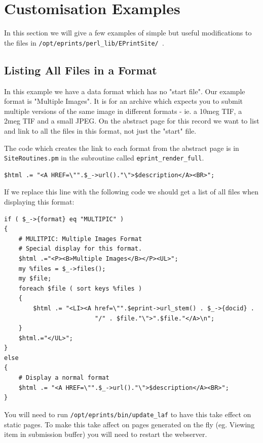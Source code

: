 \section{Customisation Examples}

In this section we will give a few examples of simple but useful
modifications to the files in {\tt /opt/eprints/perl\_lib/EPrintSite/ }.

\subsection{Listing All Files in a Format}

In this example we have a data format which has no "start file". Our example
format is "Multiple Images". It is for an archive which expects you to submit multiple versions of the same image in different formats - ie. a 10meg TIF, a 2meg TIF and a small JPEG. On the abstract page for this record we want to list and link to all the files in this format, not just the "start" file.

\par The code which creates the link to each format from the abstract page is
in {\tt SiteRoutines.pm} in the subroutine called {\tt eprint\_render\_full}.

\begin{verbatim}
$html .= "<A HREF=\"".$_->url()."\">$description</A><BR>";    
\end{verbatim}

If we replace this line with the following code we should get a list of all
files when displaying this format:

\begin{verbatim}
if ( $_->{format} eq "MULTIPIC" )
{                                                                             
	# MULITPIC: Multiple Images Format
	# Special display for this format.
	$html .="<P><B>Multiple Images</B></P><UL>";                         
	my %files = $_->files();                                                
	my $file;                                                               
	foreach $file ( sort keys %files )                                      
	{                                                                       
		$html .= "<LI><A href=\"".$eprint->url_stem() . $_->{docid} .   
                         "/" . $file."\">".$file."</A>\n";
	}                                                                       
	$html.="</UL>";                                                         
}                                                                             
else                                                                          
{                                         
	# Display a normal format
	$html .= "<A HREF=\"".$_->url()."\">$description</A><BR>";              
}         
\end{verbatim}

You will need to run {\tt /opt/eprints/bin/update\_laf} to have this take
effect on static pages. To make this take affect on pages generated on 
the fly (eg. Viewing item in submission buffer) you will need to restart
the webserver.


